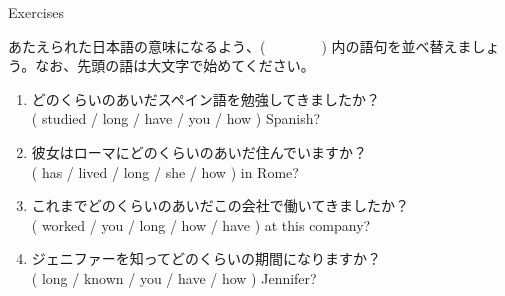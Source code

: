 \documentclass[aspectratio=169,xcolor={dvipsnames,table}]{beamer}
\begin{document}
\begin{frame}[plain]{Exercises}
 

あたえられた日本語の意味になるよう、(~~~~~~~~) 内の語句を並べ替えましょう。なお、先頭の語は大文字で始めてください。

\vspace{-5pt}

\begin{enumerate}
 \item どのくらいのあいだスペイン語を勉強してきましたか？\\
( studied / long / have / you / how ) Spanish?\\
 \item 彼女はローマにどのくらいのあいだ住んでいますか？\\
( has / lived / long / she / how ) in Rome?\\
 \item これまでどのくらいのあいだこの会社で働いてきましたか？\\
( worked /  you / long / how / have ) at this company?\\
 \item ジェニファーを知ってどのくらいの期間になりますか？\\
( long / known / you / have / how ) Jennifer?\\
\end{enumerate}
\end{frame}
\end{document}
